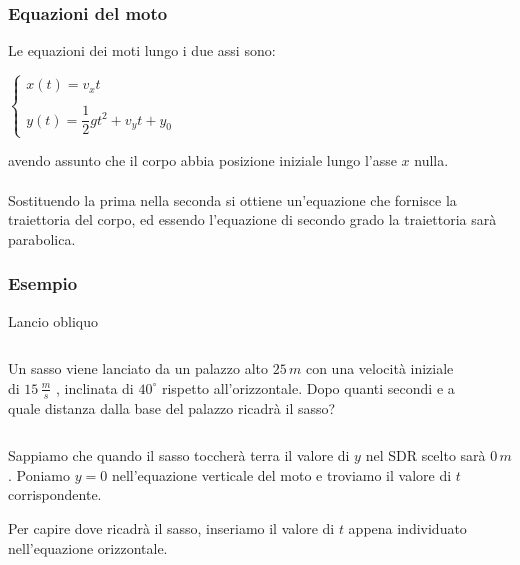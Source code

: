\documentclass[]{beamer}
\theoremstyle{plain}
\begin{document}
\begin{frame}
  \frametitle{Equazioni del moto}
  Le equazioni dei moti lungo i due assi sono:
\begin{center}
        \colorbox{blue!30}{$
  \left\{ 
  \begin{array}{l}
  x(t) = v_x t \\
  \quad\\
  y(t) = \dfrac{1}{2}gt^2 + v_y t + y_0
  \end{array}
  \right. 
  $}
    \end{center}
  avendo assunto che il corpo abbia posizione iniziale lungo l'asse $ x $ nulla.\\\pause~\\Sostituendo la prima nella seconda si ottiene un'equazione che fornisce la \alert{traiettoria del corpo}, ed essendo l'equazione di secondo grado la traiettoria sarà \alert{parabolica}.
\end{frame}


\begin{frame}
  \frametitle{Esempio}
  \begin{exampleblock}{Lancio obliquo}
  
\begin{columns}
\begin{column}{0.5\textwidth}

{\small Un sasso viene lanciato da un palazzo alto $ 25 \, m $ con una velocità iniziale di $ 15 \, \frac{m}{s}$ , inclinata di $ 40^\circ $ rispetto all'orizzontale. Dopo quanti secondi e a quale distanza dalla base del palazzo ricadrà il sasso?}

\end{column}
\begin{column}{0.4\textwidth}



\begin{figure}
\end{figure}\pause




\end{column}

\end{columns}

\end{exampleblock}

  

Sappiamo che quando il sasso toccherà terra il valore di $ y $ nel SDR scelto sarà $ 0 \, m $. Poniamo $ y=0 $ nell'equazione verticale del moto e troviamo il valore di $ t $ corrispondente.\pause

Per capire dove ricadrà il sasso, inseriamo il valore di $ t $ appena individuato nell'equazione orizzontale.
\end{frame}
\end{document}
